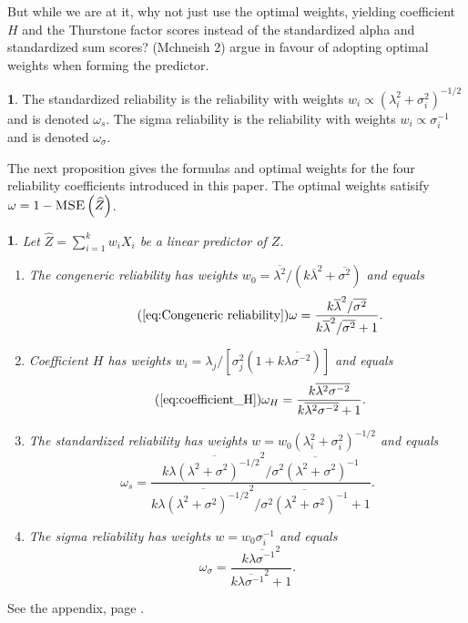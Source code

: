 \documentclass{article}
\makeatletter
\theoremstyle{plain}
\theoremstyle{plain}
\theoremstyle{definition}
\newtheorem{defn}[thm]{\protect\definitionname}
\theoremstyle{remark}
\theoremstyle{definition}
\theoremstyle{plain}
\theoremstyle{plain}
\newtheorem{prop}[thm]{\protect\propositionname}
\theoremstyle{definition}
\newenvironment{proof}[1][\protect\proofname]{\par
	\normalfont\topsep6\p@\@plus6\p@\relax
	\trivlist
	\itemindent\parindent
	\item[\hskip\labelsep\scshape #1]\ignorespaces
}{%
	\endtrivlist\@endpefalse
}
\providecommand{\proofname}{Proof}
\providecommand{\definitionname}{Definition}
\providecommand{\propositionname}{Proposition}
\makeatother
\begin{document}
But while we are at it, why not just use the optimal weights, yielding
coefficient $H$ and the Thurstone factor scores instead of the standardized
alpha and standardized sum scores? (Mchneish 2) argue in favour of
adopting optimal weights when forming the predictor.
\begin{defn}\label{defn:new reliabilities}
The standardized reliability is the reliability with weights $w_{i}\propto(\lambda_{i}^{2}+\sigma_{i}^{2})^{-1/2}$
and is denoted $\omega_{s}$. The sigma reliability is the reliability
with weights $w_{i}\propto\sigma_{i}^{-1}$ and is denoted $\omega_{\sigma}$.
\end{defn}

The next proposition gives the formulas and optimal weights for the
four reliability coefficients introduced in this paper. The optimal
weights satisify $\omega=1-\textsc{MSE}\left(\widehat{Z}\right)$.

\begin{prop}
\label{prop:Z-reliabiltiy}Let $\widehat{Z}=\sum_{i=1}^{k}w_{i}X_{i}$ be a linear predictor of $Z$.

\begin{enumerate}[label=(\roman*)]
\item The congeneric reliability has weights $w_0 =  \overline{\lambda^{2}}/(k\overline{\lambda}^{2}+\overline{\sigma^{2}})$ and equals
\begin{equation}
\tag{\ref{eq:Congeneric reliability}}
\omega=\frac{k\overline{\lambda}^{2}/\overline{\sigma^{2}}}{k\overline{\lambda}^{2}/\overline{\sigma^{2}}+1}.
\end{equation}
\item Coefficient $H$ has weights $w_i =\lambda_{j}/[\sigma_{j}^{2}(1+k\overline{\lambda\sigma^{-2}})]$ and equals
\begin{equation}
\tag{\ref{eq:coefficient_H}}
\omega_{H}=\frac{k\overline{\lambda^{2}\sigma^{-2}}}{k\overline{\lambda^{2}\sigma^{-2}}+1}.
\end{equation}
\item The standardized reliability has weights $w=w_{0}(\lambda_{i}^{2}+\sigma_{i}^{2})^{-1/2}$ and equals
\begin{equation}
\omega_s=\frac{k\overline{\lambda(\lambda^{2}+\sigma^{2})^{-1/2}}^{2}/\overline{\sigma^{2}(\lambda^{2}+\sigma^{2})^{-1}}}{k\overline{\lambda(\lambda^{2}+\sigma^{2})^{-1/2}}^{2}/\overline{\sigma^{2}(\lambda^{2}+\sigma^{2})^{-1}}+1}.
\end{equation}
\item The sigma reliability has weights $w=w_{0}\sigma_{i}^{-1}$ and equals
\begin{equation}
\omega_\sigma=\frac{k\overline{\lambda\sigma^{-1}}^{2}}{k\overline{\lambda\sigma^{-1}}^{2}+1}.\label{eq:Sigma-standardized reliability}
\end{equation}
\end{enumerate}
\end{prop}
\begin{proof}
See the appendix, page \pageref{proof:Z-reliability}.
\end{proof}
\end{document}
